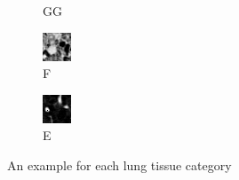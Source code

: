 \documentclass[conference]{IEEEtran}
\begin{document}
\begin{figure}[tbh]
\begin{subfigure}{0.092\textwidth}
    \caption{GG}
  \end{subfigure}
  \centering
  \begin{subfigure}{0.092\textwidth}
    \centering
    \includegraphics[width=\linewidth]{images/fibrosis.png}
    \caption{F}
  \end{subfigure}
  \centering
  \begin{subfigure}{0.092\textwidth}
    \centering
    \includegraphics[width=\linewidth]{images/emphysema.png}
    \caption{E}
  \end{subfigure}
 
  \caption{An example for each lung tissue category}
  \label{fig:texture_example}
\end{figure}
\end{document}
